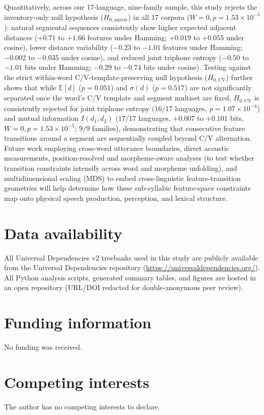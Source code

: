 \documentclass[cm]{glossa}
\begin{document}
Quantitatively, across our 17-language, nine-family sample, this study rejects the inventory-only null hypothesis ($H_{0,\text{unrest}}$) in all 17 corpora ($W=0, p=1.53 \times 10^{-5}$): natural segmental sequences consistently show higher expected adjacent distances ($+0.71$ to $+1.66$ features under Hamming; $+0.019$ to $+0.055$ under cosine), lower distance variability ($-0.23$ to $-1.01$ features under Hamming; $-0.002$ to $-0.035$ under cosine), and reduced joint triphone entropy ($-0.50$ to $-1.01$ bits under Hamming; $-0.29$ to $-0.74$ bits under cosine). Testing against the strict within-word C/V-template-preserving null hypothesis ($H_{0,\text{CV}}$) further shows that while $\mathbb{E}[d]$ ($p=0.051$) and $\sigma(d)$ ($p=0.517$) are not significantly separated once the word's C/V template and segment multiset are fixed, $H_{0,\text{CV}}$ is consistently rejected for joint triphone entropy ($16/17$ languages, $p=1.07 \times 10^{-4}$) and mutual information $I(d_1; d_2)$ ($17/17$ languages, $+0.007$ to $+0.101$ bits, $W=0, p=1.53 \times 10^{-5}$; $9/9$ families), demonstrating that consecutive feature transitions around a segment are sequentially coupled beyond C/V alternation. Future work employing cross-word utterance boundaries, direct acoustic measurements, position-resolved and morpheme-aware analyses (to test whether transition constraints intensify across word and morpheme unfolding), and multidimensional scaling (MDS) to embed cross-linguistic feature-transition geometries will help determine how these sub-syllabic feature-space constraints map onto physical speech production, perception, and lexical structure.

\section*{Data availability}
All Universal Dependencies v2 treebanks used in this study are publicly available from the Universal Dependencies repository (\url{https://universaldependencies.org/}). All Python analysis scripts, generated summary tables, and figures are hosted in an open repository (URL/DOI redacted for double-anonymous peer review).

\section*{Funding information}
No funding was received.

\section*{Competing interests}
The author has no competing interests to declare.
\end{document}
